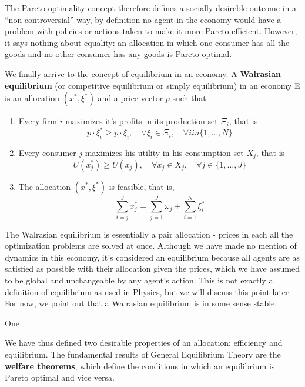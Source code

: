 The Pareto optimality concept therefore defines a socially desireble
outcome in a ``non-controversial'' way, by definition no agent in the
economy would have a problem with policies or actions taken to make it
more Pareto efficient. However, it says nothing about equality: an
allocation in which one consumer has all the goods and no other
consumer has any goods is Pareto optimal.

We finally arrive to the concept of equilibrium in an economy. A
\textbf{Walrasian equilibrium} (or competitive equilibrium or simply
equilibrium) in an economy E is an allocation $(x^\ast, \xi^\ast)$ and a
price vector $p$ such that

\begin{enumerate}
\item Every firm $i$ maximizes it's profits in its production set
  $\Xi_i$, that is
  \begin{equation}
    \label{eq:4}
    p\cdot \xi_i^\ast \geq p\cdot \xi_i, \quad \forall \xi_i \in
    \Xi_i,\quad \forall i in \{1, \ldots, N\} 
  \end{equation}
\item Every consumer $j$ maximizes his utility in his consumption set
  $X_j$, that is
  \begin{equation}
    \label{eq:1}
    U(x_j^\ast) \geq U(x_j), \quad \forall x_j \in X_j, \quad \forall
    j \in \{1,\ldots, J\}
  \end{equation}
\item The allocation $(x^\ast, \xi^\ast)$ is feasible, that is,
  \begin{equation}
    \label{eq:2}
    \sum_{i=j}^J x_j^\ast = \sum_{j=1}^J \omega_j + \sum_{i=1}^N \xi_i^\ast
  \end{equation}
\end{enumerate}

The Walrasian equilibrium is essentially a pair allocation - prices in
each all the optimization problems are solved at once. Although we
have made no mention of dynamics in this economy, it's considered an
equilibrium because all agents are as satisfied as possible with their
allocation given the prices, which we have assumed to be global and
unchangeable by any agent's action. This is not exactly a definition
of equilibrium as used in Physics, but we will discuss this point
later. For now, we point out that a Walrasian equilibrium is in some
sense stable.

One 

We have thus defined two desirable properties of an allocation:
efficiency and equilibrium. The fundamental results of General
Equilibrium Theory are the \textbf{welfare theorems}, which define the
conditions in which an equilibrium is Pareto optimal and vice versa.

